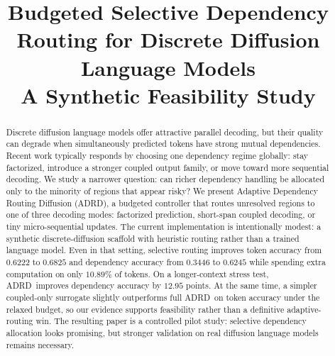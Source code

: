 \documentclass{article}
\title{Budgeted Selective Dependency Routing for Discrete Diffusion Language Models\\A Synthetic Feasibility Study}
\author{}
\newcommand{\method}{ADRD}
\begin{document}
\maketitle

\begin{abstract}
Discrete diffusion language models offer attractive parallel decoding, but their quality can degrade when simultaneously predicted tokens have strong mutual dependencies. Recent work typically responds by choosing one dependency regime globally: stay factorized, introduce a stronger coupled output family, or move toward more sequential decoding. We study a narrower question: can richer dependency handling be allocated only to the minority of regions that appear risky? We present Adaptive Dependency Routing Diffusion (\method), a budgeted controller that routes unresolved regions to one of three decoding modes: factorized prediction, short-span coupled decoding, or tiny micro-sequential updates. The current implementation is intentionally modest: a synthetic discrete-diffusion scaffold with heuristic routing rather than a trained language model. Even in that setting, selective routing improves token accuracy from $0.6222$ to $0.6825$ and dependency accuracy from $0.3446$ to $0.6245$ while spending extra computation on only $10.89\%$ of tokens. On a longer-context stress test, \method\ improves dependency accuracy by $12.95$ points. At the same time, a simpler coupled-only surrogate slightly outperforms full \method\ on token accuracy under the relaxed budget, so our evidence supports feasibility rather than a definitive adaptive-routing win. The resulting paper is a controlled pilot study: selective dependency allocation looks promising, but stronger validation on real diffusion language models remains necessary.
\end{abstract}











\end{document}
